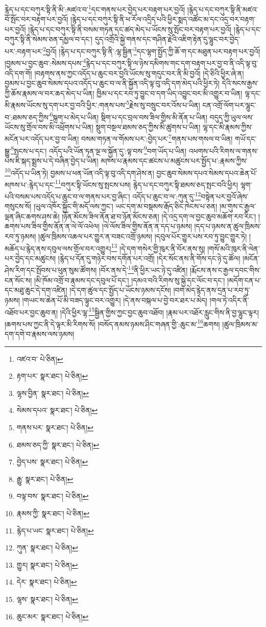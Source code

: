 རྙེད་པ་དང་བཀུར་སྟི་ནི་མི་:མཛའ་བ་\footnote{འཛའ་བ་  པེ་ཅིན། }དང་གནས་པར་བྱེད་པར་བརྟག་པར་བྱའོ། །རྙེད་པ་དང་བཀུར་སྟི་ནི་མཛའ་བོ་སྤོང་བར་བརྟག་པར་བྱའོ། །རྙེད་པ་དང་བཀུར་སྟི་ནི་ཕ་རོལ་འདྲིད་པའི་ཕྱིར་སྨད་འཚོང་མ་དང་འདྲ་བར་བརྟག་པར་བྱའོ། །རྙེད་པ་དང་བཀུར་སྟི་ནི་བསམ་གཏན་དང་ཚད་མེད་པ་ཡོངས་སུ་སྤོང་བར་བརྟག་པར་བྱའོ། །རྙེད་པ་དང་བཀུར་སྟི་ནི་སེམས་ཅན་དམྱལ་བ་དང་། དུད་འགྲོའི་སྐྱེ་གནས་དང་གཤིན་རྗེའི་འཇིག་རྟེན་དུ་ལྷུང་བར་བྱེད་པར་:བརྟག་པར་\footnote{རྟག་པར་  སྣར་ཐང་།  པེ་ཅིན། }བྱའོ། །རྙེད་པ་དང་བཀུར་སྟི་ནི་:ལྷ་སྦྱིན་\footnote{ལྷས་བྱིན་  སྣར་ཐང་།  པེ་ཅིན། }དང་ལྷག་སྤྱོད་ཀྱི་ཆོ་ག་དང་མཐུན་པར་བརྟག་པར་བྱའོ། །བྱམས་པ་བྱང་ཆུབ་:སེམས་དཔས་\footnote{སེམས་དཔའ་  སྣར་ཐང་།  པེ་ཅིན། }རྙེད་པ་དང་བཀུར་སྟི་ལ་ཉེས་དམིགས་གང་དག་བརྟག་པར་བྱ་བ་ནི་འདི་ལྟ་བུ་འདི་དག་གོ། །བརྟགས་ནས་ཀྱང་འདོད་པ་ཆུང་བར་བྱའི་ཡོངས་སུ་གདུང་བར་ནི་མི་བྱའོ། །དེ་ཅིའི་ཕྱིར་ཞེ་ན། བྱམས་པ་བྱང་ཆུབ་སེམས་དཔའ་འདོད་པ་ཆུང་བ་ལ་ནི་སྐྱོན་འདི་ལྟ་བུ་འདི་དག་མེད་པའི་ཕྱིར་ཏེ། དེའི་སངས་རྒྱས་ཀྱི་ཆོས་རྣམས་ལ་བར་ཆད་མེད་པ་ཡིན། ཁྱིམ་པ་དང་རབ་ཏུ་བྱུང་བ་དག་ཡིད་འབྱུང་བར་མི་འགྱུར་བ་ཡིན། ལྷ་དང་མི་རྣམས་ཡོངས་སུ་དག་པར་བྱ་བའི་ཕྱིར་:གནས་པས་\footnote{གནས་པར་  སྣར་ཐང་།  པེ་ཅིན། }རྗེས་སུ་བསྲུང་བར་འོས་པ་ཡིན། ངན་འགྲོ་ལོག་པར་ལྷུང་བ་:ཐམས་ཅད་ཀྱིས་\footnote{ཐམས་ཅད་ཀྱི་  སྣར་ཐང་།  པེ་ཅིན། }སྐྲག་པ་མེད་པ་ཡིན། སྡིག་པ་དང་བྲལ་བས་ཟིལ་གྱིས་མི་ནོན་པ་ཡིན། བདུད་ཀྱི་ཡུལ་ལས་ཡོངས་སུ་གྲོལ་བས་མི་འཕྲོགས་པ་ཡིན། སྡུག་བསྔལ་ཐམས་ཅད་ཀྱིས་མི་ཚུགས་པ་ཡིན། ལྷ་དང་མི་རྣམས་ཀྱིས་མངོན་པར་འདོད་པར་བྱ་བ་ཡིན། བསམ་གཏན་ལ་གོམས་པར་:བྱེད་པར་\footnote{བྱེད་པས་  སྣར་ཐང་།  པེ་ཅིན། }གནས་པས་གསལ་བ་ཡིན། གཡོ་དང་སྒྱུ་\footnote{རྒྱུ་  སྣར་ཐང་།  པེ་ཅིན། }སྤངས་པ་དང་། འདོད་པའི་ཡོན་ཏན་ལྔ་ལ་སྐྱོན་དུ་:ལྟ་བས་\footnote{བལྟ་བས་  སྣར་ཐང་།  པེ་ཅིན། }བག་ཡོད་པ་ཡིན། འཕགས་པའི་རིགས་ལ་གནས་པས་ཇི་སྐད་སྨྲས་པ་དེ་བཞིན་བྱེད་པ་ཡིན། མཁས་པ་རྣམས་དང་ཚངས་པ་མཚུངས་པར་སྤྱོད་པ་:རྣམས་ཀྱིས་\footnote{རྣམས་ཀྱི་  སྣར་ཐང་།  པེ་ཅིན། }འདོད་པ་ཡིན་ཏེ། བྱམས་པ་ཕན་ཡོན་འདི་ལྟ་བུ་འདི་དག་ཤེས་ན། བྱང་ཆུབ་སེམས་དཔའ་སེམས་དཔའ་ཆེན་པོ་མཁས་པ་:རྙེད་པ་དང་\footnote{རྙེད་པ་ཡང་  སྣར་ཐང་།  པེ་ཅིན། }བཀུར་སྟི་ཡོངས་སུ་སྤངས་པས། རྙེད་པ་དང་བཀུར་སྟི་ཐམས་ཅད་སྤང་བའི་ཕྱིར། ལྷག་པའི་བསམ་པས་འདོད་པ་ཆུང་བ་ལ་གནས་པར་བྱ་ཞིང་། འདོད་པ་ཆུང་བ་ལ་:ཀུན་དུ་\footnote{ཀུན་  སྣར་ཐང་།  པེ་ཅིན། }བསྟེན་པར་བྱའོ་ཞེས་གསུངས་སོ། །ཡུལ་འཁོར་སྐྱོང་གི་མདོ་ལས་ཀྱང་། ཡང་དག་མ་བསྡམས་རྒོད་ཅིང་ཁེངས་པ་ཅན། །མ་གུས་ང་རྒྱལ་ལྡན་ཞིང་ཆགས་ཤས་ཆེ། །ཉོན་མོངས་ཟིལ་ནོན་ཐ་བ་ཉོན་མོངས་ཅན། །དེ་འདྲ་དག་ལ་བྱང་ཆུབ་མཆོག་རབ་རིང་། །ཆགས་པས་ཟིལ་གྱིས་ནོན་ན་ལེ་ལོ་འཕེལ། །ལེ་ལོས་ཟིལ་གྱིས་ནོན་ན་དད་པ་ཉམས། །དད་པ་ཉམས་ན་ཚུལ་ཁྲིམས་རབ་ཏུ་ཉམས། །ཚུལ་ཁྲིམས་འཆལ་པར་གྱུར་ན་བཟང་འགྲོ་ཉམས། །དབུལ་པོར་གྱུར་པས་རབ་ཏུ་བྱུང་གྱུར་ཏེ། །མཆོད་པ་རྙེད་ནས་དབུལ་ལས་གྲོལ་བར་འགྱུར།\footnote{གྱུར།  སྣར་ཐང་།  པེ་ཅིན། } །དེ་དག་གསེར་གྱི་ཁུར་ནི་བོར་ནས་སུ། །གསོ་མའི་ཁུར་ནི་ལེན་པར་བྱེད་དང་མཚུངས། །རྙེད་པ་དོན་དུ་གཉེར་བས་དགོན་པར་འགྲོ། །དེར་སོང་ནས་ནི་གོས་དང་ཉེ་དུ་ཚོལ། །མངོན་ཤེས་རིག་དང་སྤོབས་པ་ཕུན་སུམ་ཚོགས། །བོར་ནས་དེ་\footnote{དེར་  སྣར་ཐང་།  པེ་ཅིན། }ནི་ཕྱིར་ཡང་ཉེ་དུ་འཛིན། །རྨོངས་ནས་ང་རྒྱལ་དབང་གིས་ངན་སོང་ས། །མི་ཁོམ་འགྲོ་བ་རྣམས་དང་དབུལ་པོ་དང་། །དམའ་བའི་རིགས་སུ་སྐྱེ་དང་ལོང་བ་དང་། །མདོག་ངན་པ་དང་མཐུ་ཆུང་དེ་དག་འཛིན། །དེ་དག་ཚུལ་དང་སྤྱོད་པ་ཡོངས་ཉམས་དངོས། །བག་མེད་རྙེད་ནས་དྲན་པ་རབ་ཏུ་ཉམས། །གཡང་ས་ཆེན་པོ་མི་བཟད་ལྟུང་བར་འགྱུར། །དེ་ནས་བསྐལ་པ་བྱེ་བར་ཐར་པ་མེད། །གལ་ཏེ་འདིར་ནི་འཐོབ་པར་བྱང་ཆུབ་ན། །དེའི་ཕྱིར་ལྷ་\footnote{ལྷས་  སྣར་ཐང་།  པེ་ཅིན། }སྦྱིན་གྱིས་ཀྱང་བྱང་ཆུབ་འཐོབ། །རྣམ་པར་འཐོར་རླུང་གིས་ནི་བྱ་ལྷུང་ལྟར། །ཆགས་པས་ཀྱང་ནི་དེ་ལྟར་མི་རིགས་སོ། །བསོད་ནམས་ཉམས་ཤིང་གཞན་གྱི་:ཆུང་མ་\footnote{ཆུང་མར་  སྣར་ཐང་།  པེ་ཅིན། }ཆགས། །ཚུལ་ཁྲིམས་མ་དག་དགེ་བ་རྣམས་ལས་ཉམས། 